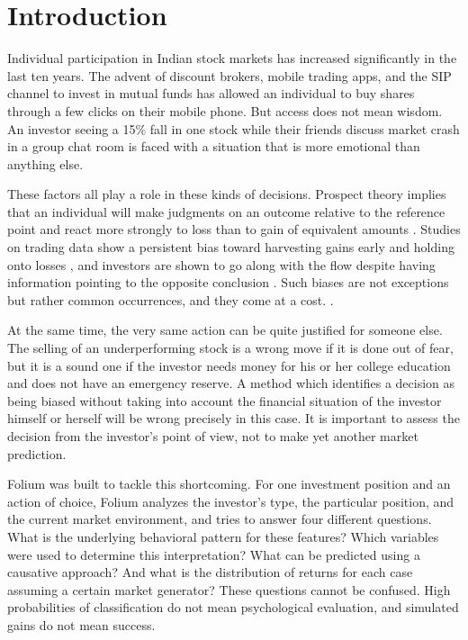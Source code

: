 \chapter{Introduction}
Individual participation in Indian stock markets has increased significantly in the last ten years. The advent of discount brokers, mobile trading apps, and the SIP channel to invest in mutual funds has allowed an individual to buy shares through a few clicks on their mobile phone. But access does not mean wisdom. An investor seeing a 15\% fall in one stock while their friends discuss market crash in a group chat room is faced with a situation that is more emotional than anything else.

These factors all play a role in these kinds of decisions. Prospect theory implies that an individual will make judgments on an outcome relative to the reference point and react more strongly to loss than to gain of equivalent amounts \cite{b1}. Studies on trading data show a persistent bias toward harvesting gains early and holding onto losses \cite{b2}, and investors are shown to go along with the flow despite having information pointing to the opposite conclusion \cite{b3}. Such biases are not exceptions but rather common occurrences, and they come at a cost. \cite{b14}.

At the same time, the very same action can be quite justified for someone else. The selling of an underperforming stock is a wrong move if it is done out of fear, but it is a sound one if the investor needs money for his or her college education and does not have an emergency reserve. A method which identifies a decision as being biased without taking into account the financial situation of the investor himself or herself will be wrong precisely in this case. It is important to assess the decision from the investor’s point of view, not to make yet another market prediction.

Folium was built to tackle this shortcoming. For one investment position and an action of choice, Folium analyzes the investor's type, the particular position, and the current market environment, and tries to answer four different questions. What is the underlying behavioral pattern for these features? Which variables were used to determine this interpretation? What can be predicted using a causative approach? And what is the distribution of returns for each case assuming a certain market generator? These questions cannot be confused. High probabilities of classification do not mean psychological evaluation, and simulated gains do not mean success.

